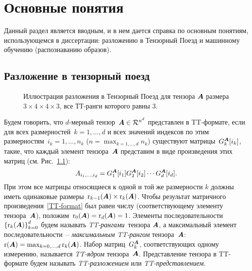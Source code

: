 \chapter{Основные понятия} \label{chap:definitions}
Данный раздел является вводным, и в нем дается справка по основным понятиям, использующемся в диссертации: разложению в Тензорный Поезд и машинному обучению (распознаванию образов).
\section{Разложение в тензорный поезд} \label{sec:tt-decomposition}

\begin{figure}[ht]
  \begin{center}
    \def\svgwidth{14cm}
    \normalsize
    
    \caption{Иллюстрация разложения в Тензорный Поезд для тензора $\boldsymbol{A}$ размера $3 \times 4 \times 4 \times 3$, все ТТ-ранги которого равны $3$. \label{fig:TT}}
    \end{center}
\end{figure}

Будем говорить, что $d$-мерный тензор~$\boldsymbol{A} \in \mathcal{R}^{n^d}$ представлен в TT\hyp{}формате, если для всех размерностей~$k=1,\ldots,d$ и всех значений индексов по этим размерностям~$i_k = 1, \ldots, n_k$ ($n = \max_{k=1,\ldots,d} n_k$) существуют матрицы~$G_k^{\boldsymbol{A}}[i_k]$, такие, что каждый элемент тензора~$\boldsymbol{A}$ представим в виде произведения этих матриц (см. Рис.~\ref{fig:TT}):
\begin{equation}
\label{TT-format}
A_{i_1, \ldots, i_d} = G_1^{\boldsymbol{A}}[i_1] G^{\boldsymbol{A}}_2[i_2] \dotsm G^{\boldsymbol{A}}_d[i_d].
\end{equation}
При этом все матрицы относящиеся к одной и той же размерности $k$ должны иметь одинаковые размеры~$\operatorname{r}_{k-1}(\boldsymbol{A}) \times \operatorname{r}_k(\boldsymbol{A})$. Чтобы результат матричного произведения~\eqref{TT-format} был равен числу (соответствующему элементу тензора~$\boldsymbol{A}$), положим~$\operatorname{r}_{0}(\boldsymbol{A}) = \operatorname{r}_{d}(\boldsymbol{A}) = 1$. Элементы последовательности~$\left\{\operatorname{r}_k(\boldsymbol{A})\right\}_{k=0}^d$ будем называть \emph{TT\hyp{}рангами}~тензора $\boldsymbol{A}$, а максимальный элемент последовательности~-- \emph{максимальным TT\hyp{}рангом} тензора~$\boldsymbol{A}$:~$\operatorname{r}(\boldsymbol{A}) = \max_{k = 0, \dots, d} \operatorname{r}_k(\boldsymbol{A})$.
Набор матриц~$G^{\boldsymbol{A}}_k$, соответствующих одному измерению, называется \emph{TT\hyp{}ядром} тензора~$\boldsymbol{A}$.
Представление тензора в TT\hyp{}формате будем называть \emph{TT\hyp{}разложением} или \emph{TT\hyp{}представлением}.

